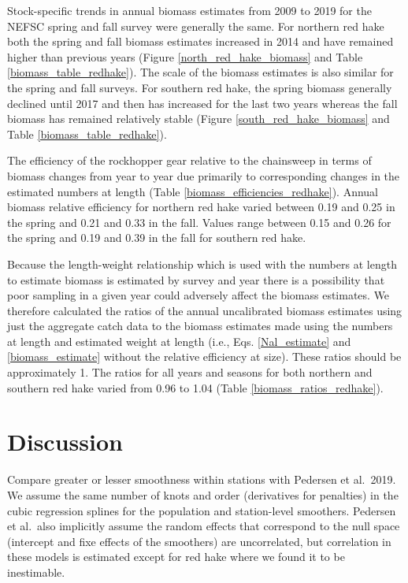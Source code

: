 \documentclass[]{article}
\begin{document}
Stock-specific trends in annual biomass estimates from 2009 to 2019 for
the NEFSC spring and fall survey were generally the same. For northern
red hake both the spring and fall biomass estimates increased in 2014
and have remained higher than previous years (Figure
\ref{north_red_hake_biomass} and Table \ref{biomass_table_redhake}). The
scale of the biomass estimates is also similar for the spring and fall
surveys. For southern red hake, the spring biomass generally declined
until 2017 and then has increased for the last two years whereas the
fall biomass has remained relatively stable (Figure
\ref{south_red_hake_biomass} and Table \ref{biomass_table_redhake}).

The efficiency of the rockhopper gear relative to the chainsweep in
terms of biomass changes from year to year due primarily to
corresponding changes in the estimated numbers at length (Table
\ref{biomass_efficiencies_redhake}). Annual biomass relative efficiency
for northern red hake varied between 0.19 and 0.25 in the spring and
0.21 and 0.33 in the fall. Values range between 0.15 and 0.26 for the
spring and 0.19 and 0.39 in the fall for southern red hake.

Because the length-weight relationship which is used with the numbers at
length to estimate biomass is estimated by survey and year there is a
possibility that poor sampling in a given year could adversely affect
the biomass estimates. We therefore calculated the ratios of the annual
uncalibrated biomass estimates using just the aggregate catch data to
the biomass estimates made using the numbers at length and estimated
weight at length (i.e., Eqs. \ref{Nal_estimate} and
\ref{biomass_estimate} without the relative efficiency at size). These
ratios should be approximately 1. The ratios for all years and seasons
for both northern and southern red hake varied from 0.96 to 1.04 (Table
\ref{biomass_ratios_redhake}).

\hypertarget{discussion}{%
\section{Discussion}\label{discussion}}

Compare greater or lesser smoothness within stations with Pedersen et
al.~2019. We assume the same number of knots and order (derivatives for
penalties) in the cubic regression splines for the population and
station-level smoothers. Pedersen et al.~also implicitly assume the
random effects that correspond to the null space (intercept and fixe
effects of the smoothers) are uncorrelated, but correlation in these
models is estimated except for red hake where we found it to be
inestimable.
\end{document}

